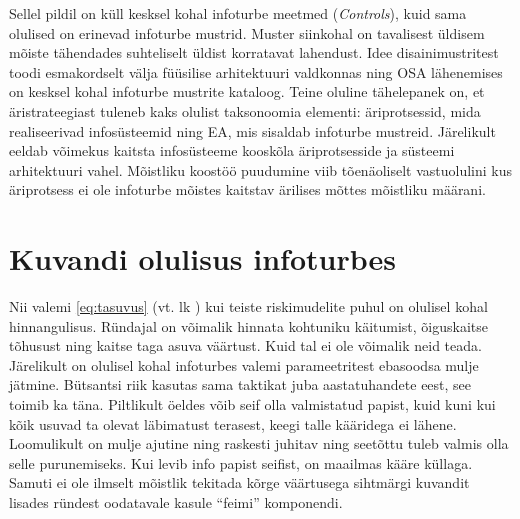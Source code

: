 Sellel pildil on küll kesksel kohal infoturbe meetmed (\emph{Controls}), kuid sama olulised on erinevad infoturbe mustrid. Muster siinkohal on tavalisest üldisem mõiste tähendades suhteliselt üldist korratavat lahendust. Idee disainimustritest toodi esmakordselt välja füüsilise arhitektuuri valdkonnas ning OSA lähenemises on kesksel kohal infoturbe mustrite kataloog. Teine oluline tähelepanek on, et äristrateegiast tuleneb kaks olulist taksonoomia elementi: äriprotsessid, mida realiseerivad infosüsteemid ning EA, mis sisaldab infoturbe mustreid. Järelikult eeldab võimekus kaitsta infosüsteeme kooskõla äriprotsesside ja süsteemi arhitektuuri vahel. Mõistliku koostöö puudumine viib tõenäoliselt vastuolulini kus äriprotsess ei ole infoturbe mõistes kaitstav ärilises mõttes mõistliku määrani.

\section{Kuvandi olulisus infoturbes}
Nii valemi \ref{eq:tasuvus} (vt. lk \pageref{eq:tasuvus}) kui teiste riskimudelite puhul on olulisel kohal hinnangulisus. Ründajal on võimalik hinnata kohtuniku käitumist, õiguskaitse tõhusust ning kaitse taga asuva väärtust. Kuid tal ei ole võimalik neid teada. Järelikult on olulisel kohal infoturbes valemi parameetritest ebasoodsa mulje jätmine. Bütsantsi riik kasutas sama taktikat juba aastatuhandete eest, see toimib ka täna. Piltlikult öeldes võib seif olla valmistatud papist, kuid kuni kui kõik usuvad ta olevat läbimatust terasest, keegi talle kääridega ei lähene. Loomulikult on mulje ajutine ning raskesti juhitav ning seetõttu tuleb valmis olla selle purunemiseks. Kui levib info papist seifist, on maailmas kääre küllaga. Samuti ei ole ilmselt mõistlik tekitada kõrge väärtusega sihtmärgi kuvandit lisades ründest oodatavale kasule \enquote{feimi} komponendi.

